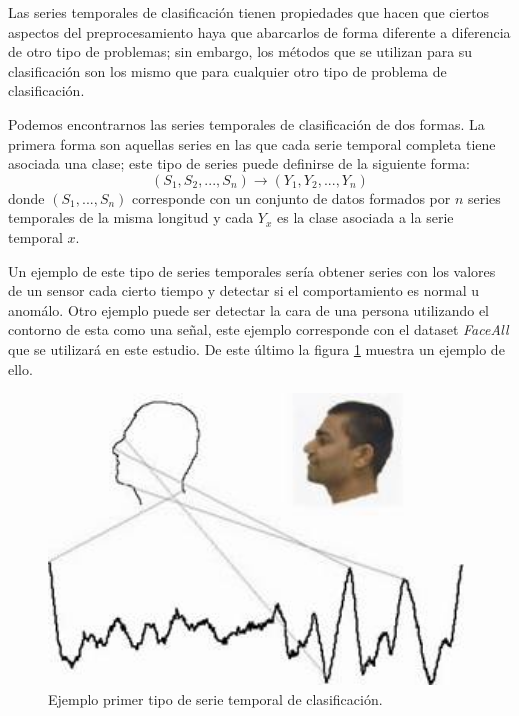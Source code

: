 Las series temporales de clasificación tienen propiedades que hacen que ciertos aspectos del preprocesamiento haya que abarcarlos de forma diferente a diferencia de otro tipo de problemas; sin embargo, los métodos que se utilizan para su clasificación son los mismo que para cualquier otro tipo de problema de clasificación.\newline

Podemos encontrarnos las series temporales de clasificación de dos formas. La primera forma son aquellas series en las que cada serie temporal completa tiene asociada una clase; este tipo de series puede definirse de la siguiente forma:\newline
$$ (S_1, S_2 ,..., S_n) \rightarrow (Y_1, Y_2, ..., Y_n) $$
\noindent donde $(S_1, ..., S_n)$ corresponde con un conjunto de datos formados por $n$ series temporales de la misma longitud y cada $Y_x$ es la clase asociada a la serie temporal $x$.\newline

Un ejemplo de este tipo de series temporales sería obtener series con los valores de un sensor cada cierto tiempo y detectar si el comportamiento es normal u anomálo. Otro ejemplo puede ser detectar la cara de una persona utilizando el contorno de esta como una señal, este ejemplo corresponde con el dataset \textit{FaceAll} que se utilizará en este estudio. De este último la figura \ref{fig:face_all_fig} muestra un ejemplo de ello.\newline

\begin{figure}[H]
	\centering
	\includegraphics[width=110mm]{imagenes/facell_all_example.jpg}
	\caption{Ejemplo primer tipo de serie temporal de clasificación.}
	\label{fig:face_all_fig}
\end{figure}
\verticalspace

